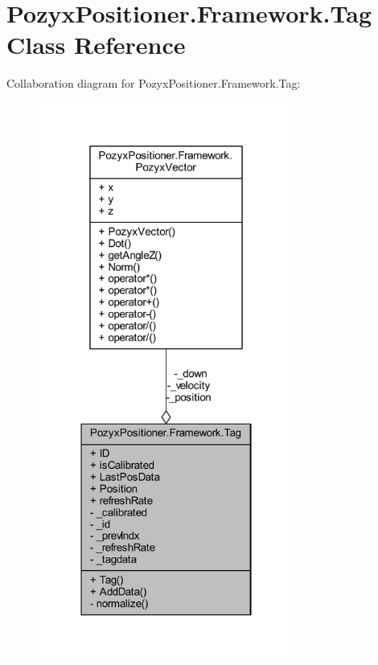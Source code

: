 \hypertarget{class_pozyx_positioner_1_1_framework_1_1_tag}{}\section{Pozyx\+Positioner.\+Framework.\+Tag Class Reference}
\label{class_pozyx_positioner_1_1_framework_1_1_tag}


Collaboration diagram for Pozyx\+Positioner.\+Framework.\+Tag\+:\nopagebreak
\begin{figure}[H]
\begin{center}
\leavevmode
\includegraphics[width=238pt]{class_pozyx_positioner_1_1_framework_1_1_tag__coll__graph}
\end{center}
\end{figure}
